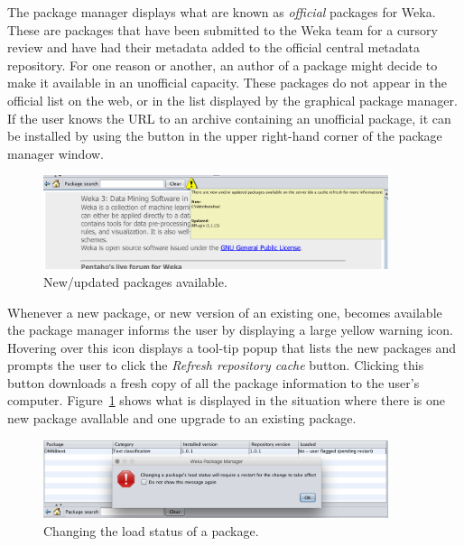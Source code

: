 The package manager displays what are known as \textit{official} packages for
Weka. These are packages that have been submitted to the Weka team for
a cursory review and have had their metadata added to the official
central metadata repository. For one reason or another, an author of a
package might decide to make it available in an unofficial
capacity. These packages do not appear in the official list on the
web, or in the list displayed by the graphical package manager. If the
user knows the URL to an archive containing an unofficial package, it
can be installed by using the button in the upper right-hand corner of
the package manager window.

\begin{figure}[!th]
\centering
\includegraphics[width=0.9\textwidth]{images/P5.png}
\caption{New/updated packages available.}
\label{fig:package_manager_5}
\end{figure}

Whenever a new package, or new version of an existing one, becomes
available the package manager informs the user by displaying a large
yellow warning icon. Hovering over this icon displays a tool-tip popup
that lists the new packages and prompts the user to click
the \textit{Refresh repository cache} button. Clicking this button
downloads a fresh copy of all the package information to the user's
computer. Figure~\ref{fig:package_manager_5} shows what is displayed
in the situation where there is one new package avallable and one
upgrade to an existing package.

\begin{figure}[!th]
\centering
\includegraphics[width=0.9\textwidth]{images/P6.png}
\caption{Changing the load status of a package.}
\label{fig:package_manager_6}
\end{figure}

